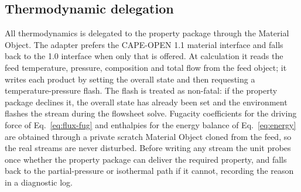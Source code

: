 \documentclass[a4paper,fleqn]{cas-dc}
\begin{document}
\subsection{Thermodynamic delegation}\label{sec:software-thermo}
All thermodynamics is delegated to the property package through the Material
Object. The adapter prefers the CAPE-OPEN 1.1 material interface and falls back
to the 1.0 interface when only that is offered. At calculation it reads the feed
temperature, pressure, composition and total flow from the feed object; it writes
each product by setting the overall state and then requesting a
temperature-pressure flash. The flash is treated as non-fatal: if the property
package declines it, the overall state has already been set and the environment
flashes the stream during the flowsheet solve. Fugacity coefficients for the
driving force of Eq.~\eqref{eq:flux-fug} and enthalpies for the energy balance of
Eq.~\eqref{eq:energy} are obtained through a private scratch Material Object
cloned from the feed, so the real streams are never disturbed. Before writing any
stream the unit probes once whether the property package can deliver the required
property, and falls back to the partial-pressure or isothermal path if it cannot,
recording the reason in a diagnostic log.
\end{document}
